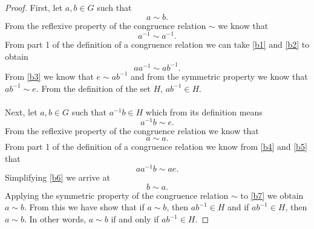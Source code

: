 \documentclass[11pt,a4paper]{article}
\begin{document}
\begin{proof}
First, let $a,b\in G$ such that 
\begin{equation}\label{b1}
a \sim b.
\end{equation}
From the reflexive property of the congruence relation $\sim$ we know that 
\begin{equation}\label{b2}
a ^{-1}\sim a^{-1}.
\end{equation}
From part 1 of the definition of a congruence relation we can take \eqref{b1} and \eqref{b2} to obtain
\begin{equation}\label{b3}
aa^{-1} \sim ab^{-1}.
\end{equation}
From \eqref{b3} we know that $e \sim ab^{-1}$ and from the symmetric property we know that $ab^{-1} \sim e$. From the definition of the set $H$, $ab^{-1}\in H$.\\
~\\
Next, let $a,b\in G$ such that $a^{-1}b \in H$ which from its definition means
\begin{equation}\label{b4}
a^{-1}b \sim e.
\end{equation}
From the reflexive property of the congruence relation we know that 
\begin{equation}\label{b5}
a \sim a.
\end{equation}
From part 1 of the definition of a congruence relation we know from \eqref{b4} and \eqref{b5} that
\begin{equation}\label{b6}
aa^{-1}b \sim ae.
\end{equation}
Simplifying \eqref{b6} we arrive at
\begin{equation}\label{b7}
b \sim a.
\end{equation}
Applying the symmetric property of the congruence relation $\sim$ to \eqref{b7} we obtain
$a \sim b$. From this we have show that if $a\sim b$, then $ab^{-1} \in H$ and if $ab^{-1} \in H$, then $a\sim b$. In other words, $a\sim b$ if and only if $ab^{-1} \in H$.
\end{proof}
\end{document}
